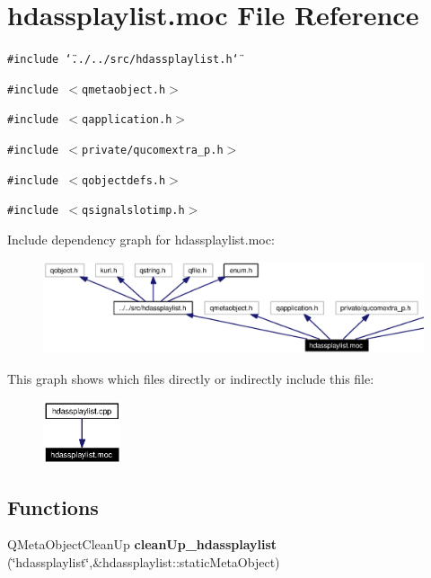 \section{hdassplaylist.moc File Reference}
\label{hdassplaylist_8moc}


{\tt \#include \char`\"{}../../src/hdassplaylist.h\char`\"{}}\par
{\tt \#include $<$qmetaobject.h$>$}\par
{\tt \#include $<$qapplication.h$>$}\par
{\tt \#include $<$private/qucomextra\_\-p.h$>$}\par
{\tt \#include $<$qobjectdefs.h$>$}\par
{\tt \#include $<$qsignalslotimp.h$>$}\par


Include dependency graph for hdassplaylist.moc:\begin{figure}[H]
\begin{center}
\leavevmode
\includegraphics[width=393pt]{hdassplaylist_8moc__incl}
\end{center}
\end{figure}


This graph shows which files directly or indirectly include this file:\begin{figure}[H]
\begin{center}
\leavevmode
\includegraphics[width=65pt]{hdassplaylist_8moc__dep__incl}
\end{center}
\end{figure}
\subsection*{Functions}
\begin{CompactItemize}
\item 
QMeta\-Object\-Clean\-Up {\bf clean\-Up\_\-hdassplaylist} (\char`\"{}hdassplaylist\char`\"{},\&hdassplaylist::static\-Meta\-Object)
\end{CompactItemize}


